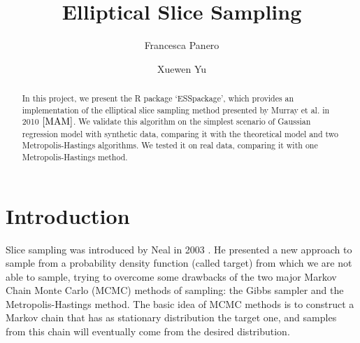 \documentclass{article}
\title{Elliptical Slice Sampling}
\author{Francesca Panero \and Xuewen Yu}
\begin{document}


\maketitle

\begin{abstract}
In this project, we present the R package `ESSpackage', which provides an implementation of the elliptical slice sampling method presented by Murray et al. in 2010 $\cite{MAM}$. We validate this algorithm on the simplest scenario of Gaussian regression model with synthetic data, comparing it with the theoretical model and two Metropolis-Hastings algorithms. We tested it on real data, comparing it with one Metropolis-Hastings method.
\end{abstract}

\section{Introduction}

Slice sampling was introduced by Neal in 2003 \cite{Neal2003}. He presented a new approach to sample from a probability density function (called target) from which we are not able to sample, trying to overcome some drawbacks of the two major Markov Chain Monte Carlo (MCMC) methods of sampling: the Gibbs sampler and the Metropolis-Hastings method. The basic idea of MCMC methods is to construct a Markov chain that has as stationary distribution the target one, and samples from this chain will eventually come from the desired distribution.

\end{document}
